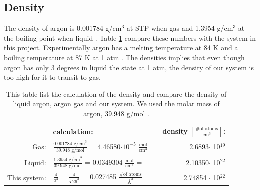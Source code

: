 \subsection{Density}

The density of argon is 0.001784 g/cm$^3$ at STP when gas and 1.3954 g/cm$^3$ at the boiling point when liquid \cite{argon}. Table \ref{tab:density} compare these numbers with the system in this project. Experimentally argon has a melting temperature at 84 K and a boiling temperature at 87 K at 1 atm \cite{argon}. The densities implies that even though argon has only 3 degrees in liquid the state at 1 atm, the density of our system is too high for it to transit to gas. 

\begin{table}[H]\caption{This table list the calculation of the density and compare the density of liquid argon, argon gas and our system. We used the molar mass of argon, 39.948 g/mol \cite{argon}.}\label{tab:density}
\center
\renewcommand{\arraystretch}{2}
\begin{tabular}{r|lr}
 &calculation:&  density $\left[ \frac{\text{\# of atoms}}{\text{cm}^3} \right]$:\\ \hline
Gas:& $\frac{0.001784 \text{ g/cm}^3 }{39.948 \text{ g/mol}}$ = 4.46580$\cdot 10^{-5}$ $\frac{\text{mol}}{\text{cm}^3}$ = & 2.6893$\cdot$ 10$^{19}$ \\
Liquid:& $\frac{1.3954 \text{ g/cm}^3 }{39.948 \text{ g/mol}}$ = 0.0349304 $\frac{\text{mol}}{\text{cm}^3}$ =& 2.10350$\cdot$ 10$^{22}$\\
This system:& $\frac{4}{a^3} = \frac{4}{5.26^3}$ = 0.027485 $\frac{\text{\# of atoms}}{\text{Å}^3}$ =& 2.74854 $\cdot$ 10$^{22}$\\
\end{tabular}
\end{table}